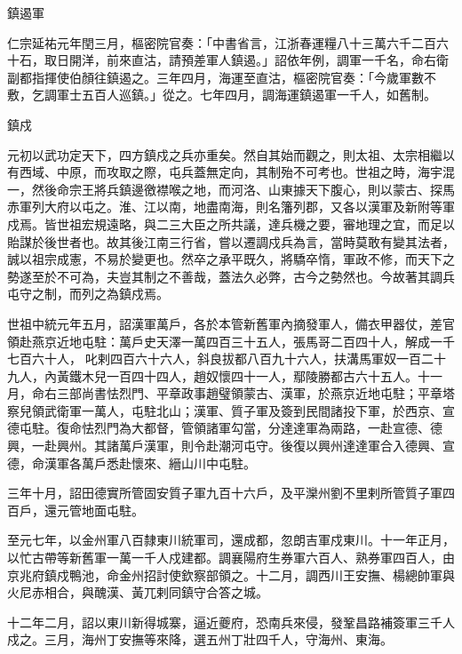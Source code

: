 \begin{pinyinscope}
 鎮遏軍



 仁宗延祐元年閏三月，樞密院官奏：「中書省言，江浙春運糧八十三萬六千二百六十石，取日開洋，前來直沽，請預差軍人鎮遏。」詔依年例，調軍一千名，命右衛副都指揮使伯顏往鎮遏之。三年四月，海運至直沽，樞密院官奏：「今歲軍數不敷，乞調軍士五百人巡鎮。」從之。七年四月，調海運鎮遏軍一千人，如舊制。



 鎮戍



 元初以武功定天下，四方鎮戍之兵亦重矣。然自其始而觀之，則太祖、太宗相繼以有西域、中原，而攻取之際，屯兵蓋無定向，其制殆不可考也。世祖之時，海宇混一，然後命宗王將兵鎮邊徼襟喉之地，而河洛、山東據天下腹心，則以蒙古、探馬赤軍列大府以屯之。淮、江以南，地盡南海，則名籓列郡，又各以漢軍及新附等軍戍焉。皆世祖宏規遠略，與二三大臣之所共議，達兵機之要，審地理之宜，而足以貽謀於後世者也。故其後江南三行省，嘗以遷調戍兵為言，當時莫敢有變其法者，誠以祖宗成憲，不易於變更也。然卒之承平既久，將驕卒惰，軍政不修，而天下之勢遂至於不可為，夫豈其制之不善哉，蓋法久必弊，古今之勢然也。今故著其調兵屯守之制，而列之為鎮戍焉。



 世祖中統元年五月，詔漢軍萬戶，各於本管新舊軍內摘發軍人，備衣甲器仗，差官領赴燕京近地屯駐：萬戶史天澤一萬四百三十五人，張馬哥二百四十人，解成一千七百六十人，叱剌四百六十六人，斜良拔都八百九十六人，扶溝馬軍奴一百二十九人，內黃鐵木兒一百四十四人，趙奴懷四十一人，鄢陵勝都古六十五人。十一月，命右三部尚書怯烈門、平章政事趙璧領蒙古、漢軍，於燕京近地屯駐；平章塔察兒領武衛軍一萬人，屯駐北山；漢軍、質子軍及簽到民間諸投下軍，於西京、宣德屯駐。復命怯烈門為大都督，管領諸軍勾當，分達達軍為兩路，一赴宣德、德興，一赴興州。其諸萬戶漢軍，則令赴潮河屯守。後復以興州達達軍合入德興、宣德，命漢軍各萬戶悉赴懷來、縉山川中屯駐。



 三年十月，詔田德實所管固安質子軍九百十六戶，及平灤州劉不里剌所管質子軍四百戶，還元管地面屯駐。



 至元七年，以金州軍八百隸東川統軍司，還成都，忽朗吉軍戍東川。十一年正月，以忙古帶等新舊軍一萬一千人戍建都。調襄陽府生券軍六百人、熟券軍四百人，由京兆府鎮戍鴨池，命金州招討使欽察部領之。十二月，調西川王安撫、楊總帥軍與火尼赤相合，與醜漢、黃兀剌同鎮守合答之城。



 十二年二月，詔以東川新得城寨，逼近夔府，恐南兵來侵，發鞏昌路補簽軍三千人戍之。三月，海州丁安撫等來降，選五州丁壯四千人，守海州、東海。




\end{pinyinscope}
